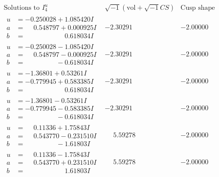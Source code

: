 \documentclass[1p]{elsarticle_modified}
\theoremstyle{definition}
\newcommand{\I}{\sqrt{-1}}
\begin{document}
$$\begin{array}{c|c|c}  
\text{Solutions to }I^u_{4}& \I (\text{vol} + \sqrt{-1}CS) & \text{Cusp shape}\\
 \hline 
\begin{aligned}
u &= -0.250028 + 1.085420 I \\
a &= \phantom{-}0.548797 + 0.000925 I \\
b &= \phantom{-0.000000 -}0.618034 I\end{aligned}
 & -2.30291\phantom{ +0.000000I} & -2.00000\phantom{ +0.000000I} \\ \hline\begin{aligned}
u &= -0.250028 - 1.085420 I \\
a &= \phantom{-}0.548797 - 0.000925 I \\
b &= \phantom{-0.000000 } -0.618034 I\end{aligned}
 & -2.30291\phantom{ +0.000000I} & -2.00000\phantom{ +0.000000I} \\ \hline\begin{aligned}
u &= -1.36801 + 0.53261 I \\
a &= -0.779945 + 0.583385 I \\
b &= \phantom{-0.000000 -}0.618034 I\end{aligned}
 & -2.30291\phantom{ +0.000000I} & -2.00000\phantom{ +0.000000I} \\ \hline\begin{aligned}
u &= -1.36801 - 0.53261 I \\
a &= -0.779945 - 0.583385 I \\
b &= \phantom{-0.000000 } -0.618034 I\end{aligned}
 & -2.30291\phantom{ +0.000000I} & -2.00000\phantom{ +0.000000I} \\ \hline\begin{aligned}
u &= \phantom{-}0.11336 + 1.75843 I \\
a &= \phantom{-}0.543770 - 0.231510 I \\
b &= \phantom{-0.000000 } -1.61803 I\end{aligned}
 & \phantom{-}5.59278\phantom{ +0.000000I} & -2.00000\phantom{ +0.000000I} \\ \hline\begin{aligned}
u &= \phantom{-}0.11336 - 1.75843 I \\
a &= \phantom{-}0.543770 + 0.231510 I \\
b &= \phantom{-0.000000 -}1.61803 I\end{aligned}
 & \phantom{-}5.59278\phantom{ +0.000000I} & -2.00000\phantom{ +0.000000I} \\ \hline\begin{aligned}

\end{aligned}
\end{array}$$
\end{document}
